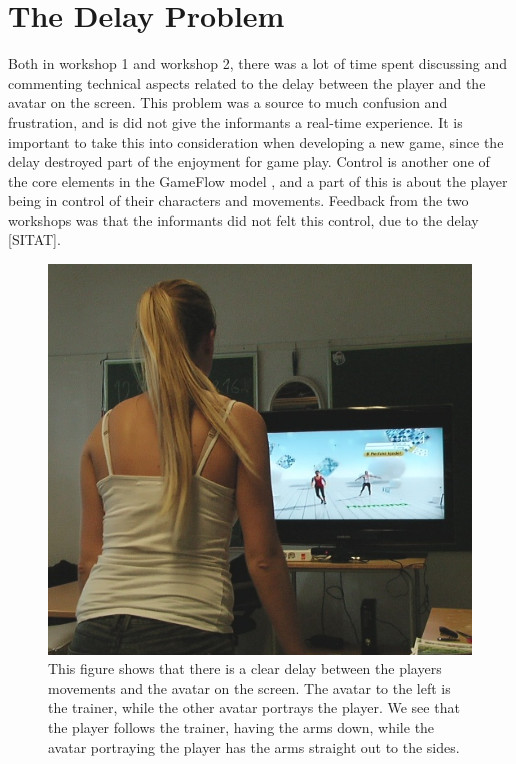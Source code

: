 \section{The Delay Problem}
\label{sec:delay}
Both in workshop 1 and workshop 2, there was a lot of time spent discussing and commenting technical aspects related to the delay between the player and the avatar on the screen. This problem was a source to much confusion and frustration, and is did not give the informants a real-time experience. It is important to take this into consideration when developing a new game, since the delay destroyed part of the enjoyment for game play. Control is another one of the core elements in the GameFlow model \cite{sweetser}, and a part of this is about the player being in control of their characters and movements. Feedback from the two workshops was that the informants did not felt this control, due to the delay [SITAT].  


\begin{figure} [H]
\centering
\includegraphics[scale=0.7]{kineDelay.jpg}
\caption[The Kinect sensor delay]{This figure shows that there is a clear delay between the players movements and the avatar on the screen. The avatar to the left is the trainer, while the other avatar portrays the player. We see that the player follows the trainer, having the arms down, while the avatar portraying the player has the arms straight out to the sides.}
\label{pickingapples}
\end{figure}

